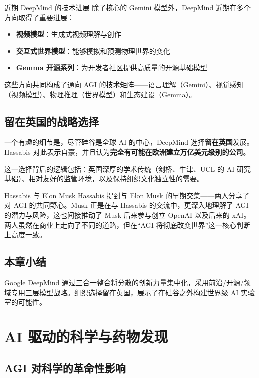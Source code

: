 \documentclass[a4paper]{article}
\begin{document}
\begin{knowledgebox}{近期 DeepMind 的技术进展}
除了核心的 Gemini 模型外，DeepMind 近期在多个方向取得了重要进展：
\begin{itemize}
    \item \textbf{视频模型}：生成式视频理解与创作
    \item \textbf{交互式世界模型}：能够模拟和预测物理世界的变化
    \item \textbf{Gemma 开源系列}：为开发者社区提供高质量的开源基础模型
\end{itemize}
这些方向共同构成了通向 AGI 的技术矩阵——语言理解（Gemini）、视觉感知（视频模型）、物理推理（世界模型）和生态建设（Gemma）。
\end{knowledgebox}

\subsection{留在英国的战略选择}

一个有趣的细节是，尽管硅谷是全球 AI 的中心，DeepMind 选择\textbf{留在英国}发展。Hassabis 对此表示自豪，并且认为\textbf{完全有可能在欧洲建立万亿美元级别的公司}。

这一选择背后的逻辑包括：英国深厚的学术传统（剑桥、牛津、UCL 的 AI 研究基础）、相对友好的监管环境，以及保持组织文化独立性的需要。

\begin{knowledgebox}{Hassabis 与 Elon Musk}
Hassabis 提到与 Elon Musk 的早期交集——两人分享了对 AGI 的共同野心。Musk 正是在与 Hassabis 的交流中，更深入地理解了 AGI 的潜力与风险，这也间接推动了 Musk 后来参与创立 OpenAI 以及后来的 xAI。两人虽然在商业上走向了不同的道路，但在``AGI 将彻底改变世界''这一核心判断上高度一致。
\end{knowledgebox}

\subsection{本章小结}

Google DeepMind 通过三合一整合将分散的创新力量集中化，采用前沿/开源/领域专用三层模型战略。组织选择留在英国，展示了在硅谷之外构建世界级 AI 实验室的可能性。

\section{AI 驱动的科学与药物发现}

\subsection{AGI 对科学的革命性影响}
\end{document}
